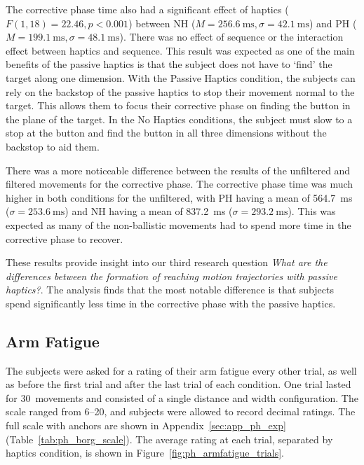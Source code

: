 The corrective phase time also had a significant effect of haptics ($F(1, 18)=22.46, p<0.001$) between NH ($M=\SI{256.6}{\milli\second}, \sigma=\SI{42.1}{\milli\second}$) and PH ($M=\SI{199.1}{\milli\second}, \sigma=\SI{48.1}{\milli\second}$).
There was no effect of sequence or the interaction effect between haptics and sequence.
This result was expected as one of the main benefits of the passive haptics is that the subject does not have to `find' the target along one dimension.
With the Passive Haptics condition, the subjects can rely on the backstop of the passive haptics to stop their movement normal to the target.
This allows them to focus their corrective phase on finding the button in the plane of the target.
In the No Haptics conditions, the subject must slow to a stop at the button and find the button in all three dimensions without the backstop to aid them.

There was a more noticeable difference between the results of the unfiltered and filtered movements for the corrective phase.
The corrective phase time was much higher in both conditions for the unfiltered, with PH having a mean of \SI{564.7}{\milli\second} ($\sigma=\SI{253.6}{\milli\second}$) and NH having a mean of \SI{837.2}{\milli\second} ($\sigma=\SI{293.2}{\milli\second}$).
This was expected as many of the non-ballistic movements had to spend more time in the corrective phase to recover.

These results provide insight into our third research question \textit{What are the differences between the formation of reaching motion trajectories with passive haptics?}.
The analysis finds that the most notable difference is that subjects spend significantly less time in the corrective phase with the passive haptics.

\subsection{Arm Fatigue}

The subjects were asked for a rating of their arm fatigue every other trial, as well as before the first trial and after the last trial of each condition.
One trial lasted for 30~movements and consisted of a single distance and width configuration.
The scale ranged from \numrange{6}{20}, and subjects were allowed to record decimal ratings.
The full scale with anchors are shown in Appendix~\ref{sec:app_ph_exp} (Table~\ref{tab:ph_borg_scale}).
The average rating at each trial, separated by haptics condition, is shown in Figure~\ref{fig:ph_armfatigue_trials}.

